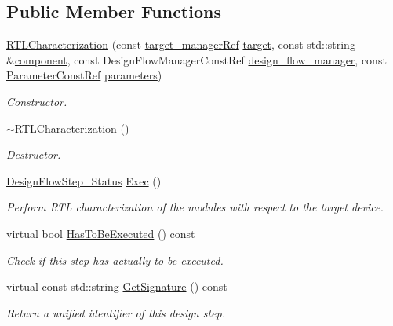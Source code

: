 \subsection*{Public Member Functions}
\begin{DoxyCompactItemize}
\item 
\hyperlink{classRTLCharacterization_af5d91dd2126f3d7352a05c9ff129d452}{R\+T\+L\+Characterization} (const \hyperlink{target__manager_8hpp_aee0b586a84fb6eb4faefa6e41e1735a9}{target\+\_\+manager\+Ref} \hyperlink{classFunctionalUnitStep_a1f90bc8bd6531c4cdf67966734a66cea}{target}, const std\+::string \&\hyperlink{classRTLCharacterization_a81db435891a407a40bdf46b77d6032e3}{component}, const Design\+Flow\+Manager\+Const\+Ref \hyperlink{classDesignFlowStep_ab770677ddf087613add30024e16a5554}{design\+\_\+flow\+\_\+manager}, const \hyperlink{Parameter_8hpp_a37841774a6fcb479b597fdf8955eb4ea}{Parameter\+Const\+Ref} \hyperlink{classDesignFlowStep_a802eaafe8013df706370679d1a436949}{parameters})
\begin{DoxyCompactList}\small\item\em Constructor. \end{DoxyCompactList}\item 
\hyperlink{classRTLCharacterization_a722fe030d54dd7f095e61b60d66e5d8f}{$\sim$\+R\+T\+L\+Characterization} ()
\begin{DoxyCompactList}\small\item\em Destructor. \end{DoxyCompactList}\item 
\hyperlink{design__flow__step_8hpp_afb1f0d73069c26076b8d31dbc8ebecdf}{Design\+Flow\+Step\+\_\+\+Status} \hyperlink{classRTLCharacterization_a6550aa6ae4bcf74abe7cb170f82d5905}{Exec} ()
\begin{DoxyCompactList}\small\item\em Perform R\+TL characterization of the modules with respect to the target device. \end{DoxyCompactList}\item 
virtual bool \hyperlink{classRTLCharacterization_a8bd96bf987458c331aab335f764da995}{Has\+To\+Be\+Executed} () const
\begin{DoxyCompactList}\small\item\em Check if this step has actually to be executed. \end{DoxyCompactList}\item 
virtual const std\+::string \hyperlink{classRTLCharacterization_a04f2b9b10118caba1e50a27769445f21}{Get\+Signature} () const
\begin{DoxyCompactList}\small\item\em Return a unified identifier of this design step. \end{DoxyCompactList}\item 

\end{DoxyCompactItemize}
